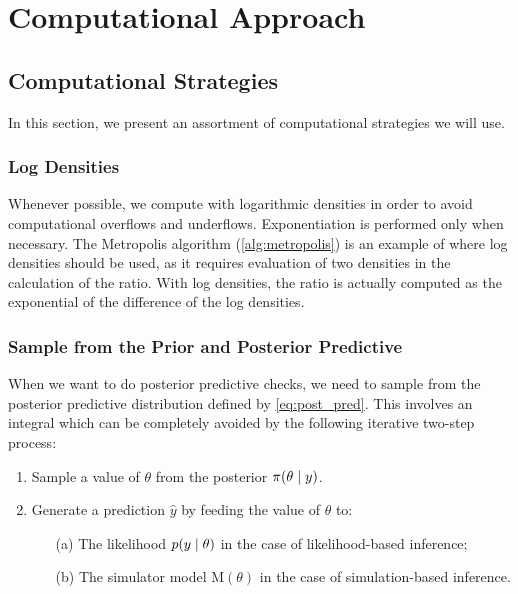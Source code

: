 \chapter{Computational Approach}\label{chap:comp_approach}


\section{Computational Strategies}

In this section, we present an assortment of computational strategies we will use. 


\subsection{Log Densities}

Whenever possible, we compute with logarithmic densities in order to avoid computational overflows and underflows. Exponentiation is performed only when necessary. The Metropolis algorithm (\cref{alg:metropolis}) is an example of where log densities should be used, as it requires evaluation of two densities in the calculation of the ratio. With log densities, the ratio is actually computed as the exponential of the difference of the log densities.   


\subsection{Sample from the Prior and Posterior Predictive} 

When we want to do posterior predictive checks, we need to sample from the posterior predictive distribution defined by \autoref{eq:post_pred}. This involves an integral which can be completely avoided by the following iterative two-step process:
\begin{enumerate}
    \item Sample a value of $\theta$ from the posterior $\pi \qty(\theta \mid y)$. 
    \item Generate a prediction $\hat{y}$ by feeding the value of $\theta$ to:
    \begin{itemize}
        \item[(a)] The likelihood $p \qty(y \mid \theta)$ in the case of likelihood-based inference;
        \item[(b)] The simulator model $\mathrm{M}(\theta)$ in the case of simulation-based inference. 
    \end{itemize}
\end{enumerate}

